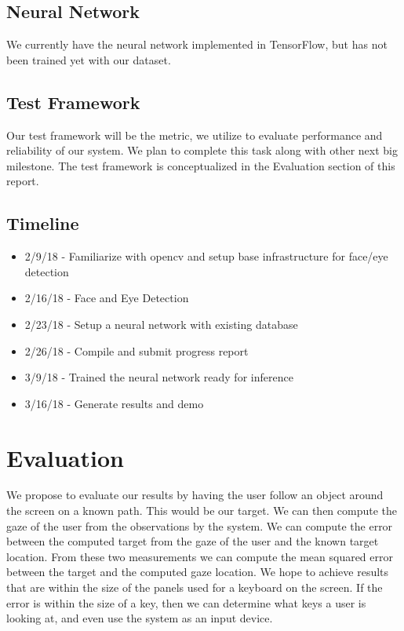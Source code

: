 \documentclass[10pt,twocolumn,letterpaper]{article}
\begin{document}
\subsection{Neural Network}
We currently have the neural network implemented in TensorFlow, but
has not been trained yet with our dataset.

\subsection{Test Framework}
Our test framework will be the metric, we utilize to evaluate performance 
and reliability of our system. We plan to complete this task along 
with other next big milestone. The test framework is conceptualized 
in the Evaluation section of this report.



\subsection{Timeline}
\begin{itemize}
  \item 2/9/18 - Familiarize with opencv and setup base infrastructure for face/eye detection
  \item 2/16/18 - Face and Eye Detection
  \item 2/23/18 - Setup a neural network with existing database
  \item 2/26/18 - Compile and submit progress report
  \item 3/9/18 - Trained the neural network ready for inference 
  \item 3/16/18 - Generate results and demo
\end{itemize}

\section{Evaluation}
We propose to evaluate our results by having the user follow an object
around the screen on a known path. This would be our target. We can
then compute the gaze of the user from the observations by the
system. We can compute the error between the computed target from the
gaze of the user and the known target location. From these two
measurements we can compute the mean squared error between the target
and the computed gaze location. We hope to achieve results that are
within the size of the panels used for a keyboard on the screen. If
the error is within the size of a key, then we can determine what keys
a user is looking at, and even use the system as an input device.
\end{document}
